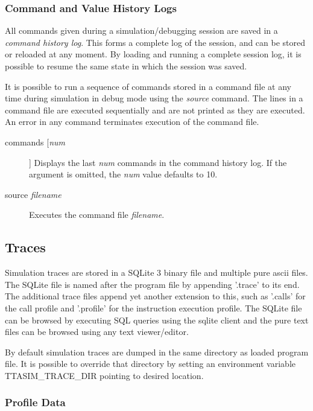 \documentclass[a4paper,twoside]{tceusermanual}
\begin{document}
\subsubsection{Command and Value History Logs}
\label{ssec:debug-history}

All commands given during a simulation/debugging session are saved in a
\emph{command history log}.  This forms a complete log of the session, and
can be stored or reloaded at any moment.  By loading and running a complete
session log, it is possible to resume the same state in which the session
was saved.

It is possible to run a sequence of commands stored in a command file at any
time during simulation in debug mode using the \emph{source} command.  The
lines in a command file are executed sequentially and are not printed as
they are executed.  An error in any command terminates execution of the
command file.

\begin{description}
\item[commands [\emph{num}]]%
  Displays the last \emph{num} commands in the command history log. If
  the argument is omitted, the \emph{num} value defaults to 10.

\item[source \emph{filename}]%
  Executes the command file \emph{filename}.

\end{description}

\subsection{Traces}
\label{sec:traces}

Simulation traces are stored in a SQLite 3 binary file and multiple pure
ascii files. The SQLite file is named after the program file by appending '.trace' 
to its end. The additional trace files append yet another extension to this,
such as '.calls' for the call profile and '.profile' for the instruction
execution profile. The SQLite file can be browsed by executing SQL queries
using the sqlite client and the pure text files can be browsed using any 
text viewer/editor.

By default simulation traces are dumped in the same directory as loaded program
file. It is possible to override that directory by setting an environment
variable TTASIM\_TRACE\_DIR pointing to desired location.

\subsubsection{Profile Data}
\end{document}
